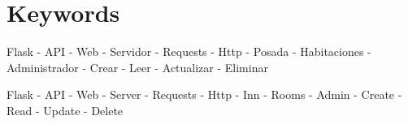 \section{Keywords}

Flask - API - Web - Servidor - Requests - Http - Posada - Habitaciones - Administrador - Crear - Leer - Actualizar - Eliminar

Flask - API - Web - Server - Requests - Http - Inn - Rooms - Admin - Create - Read - Update - Delete
